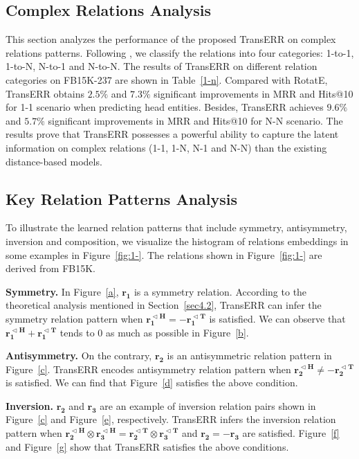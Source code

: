 \documentclass[10pt, a4paper]{article}
\begin{document}
	\subsection{Complex Relations Analysis}\label{sec6.3}
	This section analyzes the performance of the proposed TransERR on complex relations patterns. Following \citet{han2018openke}, we classify the relations into four categories: 1-to-1, 1-to-N, N-to-1 and N-to-N. The results of TransERR on different relation categories on FB15K-237 are shown in Table~\ref{1-n}. Compared with RotatE, TransERR obtains $2.5\%$ and  $7.3\%$ significant improvements in MRR and  Hits@10 for 1-1 scenario when predicting head entities. Besides, TransERR achieves $9.6\%$ and $5.7\%$ significant improvements in MRR and  Hits@10 for N-N scenario. The results prove that TransERR possesses a powerful ability to capture the latent information on complex relations (1-1, 1-N, N-1 and N-N) than the existing distance-based models.
	
	

	\subsection{Key Relation Patterns Analysis}\label{7-3}


	To illustrate the learned relation patterns that include symmetry, antisymmetry, inversion and composition, we visualize the histogram of relations embeddings in some examples in Figure~\ref{fig:1-}. The relations shown in Figure~\ref{fig:1-} are derived from FB15K.
	
	\textbf{Symmetry.} In Figure~\ref{a}, $\mathbf{r_1}$ is a symmetry relation. According to the theoretical analysis mentioned in Section~\ref{sec4.2}, TransERR can infer the symmetry relation pattern when $\mathbf{r_1^{\vartriangleleft H}} =-\mathbf{r_1^{\vartriangleleft T}}$ is satisfied. We can observe that $\mathbf{r_1^{\vartriangleleft H}}+\mathbf{r_1^{\vartriangleleft T}}$ tends to $0$ as much as possible in Figure~\ref{b}.
	
	\textbf{Antisymmetry.} On the contrary, $\mathbf{r_2}$ is an antisymmetric relation pattern in Figure~\ref{c}. TransERR encodes antisymmetry relation pattern when $\mathbf{r_2^{\vartriangleleft H}} \neq -\mathbf{r_2^{\vartriangleleft T}}$ is satisfied. We can find that Figure~\ref{d} satisfies the above condition.
	
	\textbf{Inversion.} $\mathbf{r_2}$ and $\mathbf{r_3}$ are an example of inversion relation pairs shown in Figure~\ref{c} and Figure~\ref{e}, respectively.  TransERR infers the inversion relation pattern when  $\mathbf{r_2^{\vartriangleleft H}} \otimes \mathbf{r_3^{\vartriangleleft H}} = \mathbf{r_2^{\vartriangleleft T}} \otimes \mathbf{r_3^{\vartriangleleft T}} $ and $\mathbf{r_2}= -\mathbf{r_3}$ are satisfied. Figure~\ref{f} and Figure~\ref{g} show that TransERR satisfies the above conditions.
	
\end{document}
